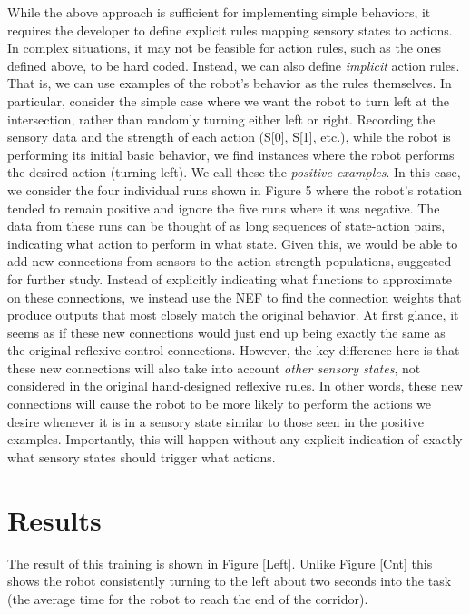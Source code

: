\documentclass[conference]{IEEEtran}
\begin{document}
While the above approach is sufficient for implementing
simple behaviors, it requires the developer to define explicit
rules mapping sensory states to actions. In complex
situations, it may not be feasible for action rules, such as the
ones defined above, to be hard coded. Instead,
we can also define \textit{implicit} action rules. That is, we can use
examples of the robot's behavior as the rules
themselves.
In particular, consider the simple case where we want the robot to turn left at the intersection, rather than randomly turning either left or right. Recording the sensory data and the strength of each action (S[0], S[1], etc.), while the robot is performing its initial basic behavior, we find instances where the robot performs the desired action (turning left). We call these the \textit{positive examples}. In this case, we consider the four individual runs shown in Figure 5 where the robot's rotation tended to remain positive and ignore the five runs where it was negative. The data from these runs can be thought of as long sequences of state-action pairs, indicating what action to perform in what state. Given this, we would be able to add new connections from sensors to the action strength populations, suggested for further study. Instead of explicitly indicating what functions to approximate on these connections, we instead use the NEF to find the connection weights that produce outputs that most closely match the original behavior. At first glance, it seems as if these new connections would just end up being exactly the same as the original reflexive control connections. However, the key difference here is that these new connections will also take into account \textit{other sensory states}, not considered in the original hand-designed reflexive rules. In other words, these new connections will cause the robot to be more likely to perform the actions we desire whenever it is in a sensory state similar to those seen in the positive examples. Importantly, this will happen without any explicit indication of exactly what sensory states should trigger what actions.

\section{Results}

The result of this training is shown in Figure \ref{Left}. Unlike Figure \ref{Cnt} this shows the robot consistently turning to the left about two seconds into the task (the average time for the robot to reach the end of the corridor).
\end{document}
